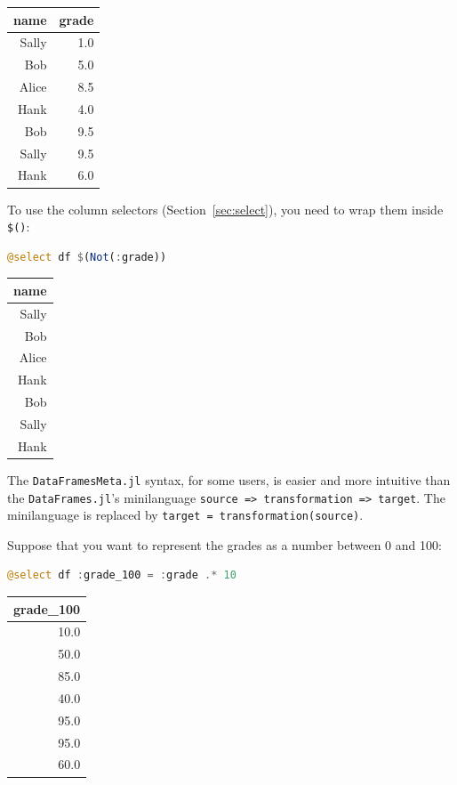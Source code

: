 \documentclass[
  notoc %
]{tufte-book}
\newcommand{\passthrough}[1]{#1}
\begin{document}
\begin{longtable}[]{@{}rr@{}}
\toprule
name & grade \\
\midrule
\endhead
Sally & 1.0 \\
Bob & 5.0 \\
Alice & 8.5 \\
Hank & 4.0 \\
Bob & 9.5 \\
Sally & 9.5 \\
Hank & 6.0 \\
\bottomrule
\end{longtable}

To use the column selectors (Section~\ref{sec:select}), you need to wrap
them inside \passthrough{\lstinline!$()!}:

\begin{lstlisting}[language=Julia]
@select df $(Not(:grade))
\end{lstlisting}

\begin{longtable}[]{@{}r@{}}
\toprule
name \\
\midrule
\endhead
Sally \\
Bob \\
Alice \\
Hank \\
Bob \\
Sally \\
Hank \\
\bottomrule
\end{longtable}

The \passthrough{\lstinline!DataFramesMeta.jl!} syntax, for some users,
is easier and more intuitive than the
\passthrough{\lstinline!DataFrames.jl!}'s minilanguage
\passthrough{\lstinline!source => transformation => target!}. The
minilanguage is replaced by
\passthrough{\lstinline!target = transformation(source)!}.

Suppose that you want to represent the grades as a number between 0 and
100:

\begin{lstlisting}[language=Julia]
@select df :grade_100 = :grade .* 10
\end{lstlisting}

\begin{longtable}[]{@{}r@{}}
\toprule
grade\_100 \\
\midrule
\endhead
10.0 \\
50.0 \\
85.0 \\
40.0 \\
95.0 \\
95.0 \\
60.0 \\
\bottomrule
\end{longtable}
\end{document}

